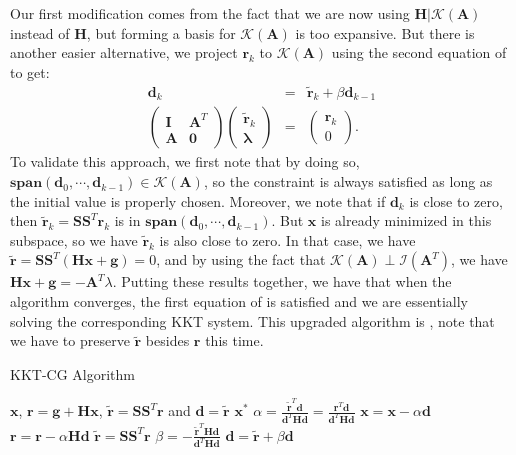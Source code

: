 \documentclass[annual]{acmsiggraph}
\newcommand{\E}[1]{\mathbf{#1}}
\newcommand{\TWOC}[2]{\left(\begin{array}{c}#1 \\ #2\end{array}\right)}
\newcommand{\MTT}[4]{\left(\begin{array}{cc}#1 & #2 \\ #3 & #4\end{array}\right)}
\begin{document}
Our first modification comes from the fact that we are now using $\E{H}|\mathcal{K}(\E{A})$ instead of $\E{H}$, but forming a basis for $\mathcal{K}(\E{A})$ is too expansive. But there is another easier alternative, we project $\E{r}_k$ to $\mathcal{K}(\E{A})$ using the second equation of  to get:
\begin{eqnarray*}
\E{d}_k&=&\tilde{\E{r}}_k+\beta\E{d}_{k-1}	\\
\MTT{\E{I}}{\E{A}^T}{\E{A}}{\E{0}}\TWOC{\tilde{\E{r}}_k}{\E{\lambda}}&=&\TWOC{\E{r}_k}{0}.
\end{eqnarray*}
To validate this approach, we first note that by doing so, $\E{span}(\E{d}_0,\cdots,\E{d}_{k-1}) \in \mathcal{K}(\E{A})$, so the constraint is always satisfied as long as the initial value is properly chosen. Moreover, we note that if $\E{d}_k$ is close to zero, then $\tilde{\E{r}}_k=\E{S}\E{S}^T\E{r}_k$ is in $\E{span}(\E{d}_0,\cdots,\E{d}_{k-1})$. But $\E{x}$ is already minimized in this subspace, so we have $\tilde{\E{r}}_k$ is also close to zero. In that case, we have $\tilde{\E{r}}=\E{S}\E{S}^T(\E{H}\E{x}+\E{g})=0$, and by using the fact that $\mathcal{K}(\E{A})\perp\mathcal{I}(\E{A}^T)$, we have $\E{H}\E{x}+\E{g}=-\E{A}^T\lambda$. Putting these results together, we have that when the algorithm converges, the first equation of  is satisfied and we are essentially solving the corresponding KKT system. This upgraded algorithm is , note that we have to preserve $\tilde{\E{r}}$ besides $\E{r}$ this time.
\begin{algorithm}[h]
\caption{KKT-CG Algorithm}
\label{alg:KKTCG}
\begin{algorithmic}
\REQUIRE $\E{x}$, $\E{r}=\E{g}+\E{H}\E{x}$, $\tilde{\E{r}}=\E{S}\E{S}^T\E{r}$ and $\E{d}=\tilde{\E{r}}$
\ENSURE $\E{x}^*$
\WHILE{$\|\tilde{\E{r}}\|$ not small}
\STATE $\alpha=\frac{\tilde{\E{r}}^T\E{d}}{\E{d}^T\E{H}\E{d}}=\frac{\E{r}^T\E{d}}{\E{d}^T\E{H}\E{d}}$
\STATE $\E{x}=\E{x}-\alpha\E{d}$
\STATE $\E{r}=\E{r}-\alpha\E{H}\E{d}$
\STATE $\tilde{\E{r}}=\E{S}\E{S}^T\E{r}$
\STATE $\beta=-\frac{\tilde{\E{r}}^T\E{H}\E{d}}{\E{d}^T\E{H}\E{d}}$
\STATE $\E{d}=\tilde{\E{r}}+\beta\E{d}$
\ENDWHILE
\end{algorithmic}
\end{algorithm}
\end{document}
